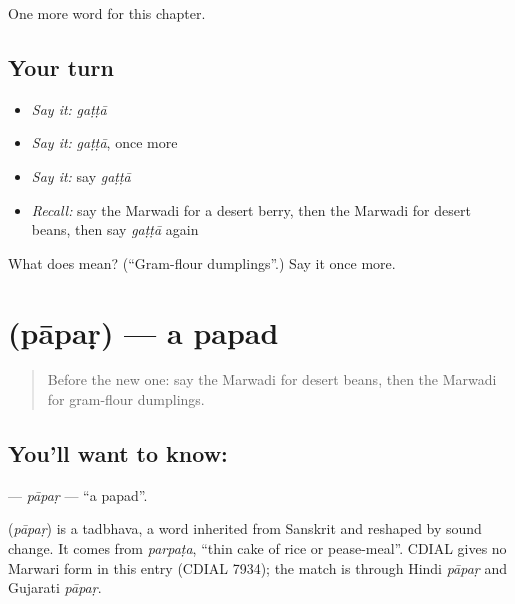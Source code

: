 \begin{grammarlens}[title={What you've built}]
One more word for this chapter.
\end{grammarlens}

\subsection*{Your turn}
\begin{itemize}
\raggedright
  \item \emph{Say it:} \emph{gaṭṭā}
  \item \emph{Say it:} \emph{gaṭṭā}, once more
  \item \emph{Say it:} say \emph{gaṭṭā}
  \item \emph{Recall:} say the Marwadi for a desert berry, then the Marwadi for desert beans, then say \emph{gaṭṭā} again
\end{itemize}

\begin{tcolorbox}[breakable,colback=teal!4,colframe=teal!35!black,title={Before you move on}]
What does  mean? (\textquotedblleft{}Gram-flour dumplings\textquotedblright{}.) Say it once more.
\end{tcolorbox}
\section[\texorpdfstring{\mw{पापड़} (pāpaṛ)}{पापड़ (pāpaṛ)}]{ (pāpaṛ) — a papad}

\label{lesson:MW-C131-papar}



\begin{quote}
Before the new one: say the Marwadi for desert beans, then the Marwadi for gram-flour dumplings.
\end{quote}

\subsection*{You'll want to know: }
\textbf{} — \emph{pāpaṛ} — \textquotedblleft{}a papad\textquotedblright{}.

\begin{cousinweb}
\textbf{} (\emph{pāpaṛ}) is a tadbhava, a word inherited from Sanskrit and reshaped by sound change. It comes from \emph{parpaṭa}, \textquotedblleft{}thin cake of rice or pease-meal\textquotedblright{}. CDIAL gives no Marwari form in this entry (CDIAL 7934); the match is through Hindi \emph{pāpaṛ} and Gujarati \emph{pāpaṛ}.
\end{cousinweb}

